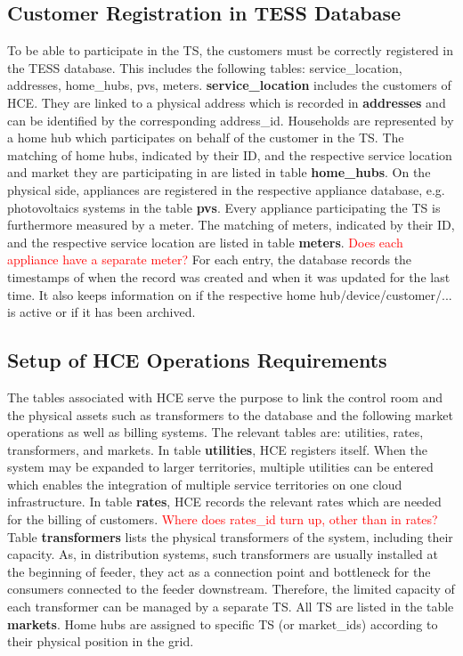 \subsection{Customer Registration in TESS Database}

To be able to participate in the TS, the customers must be correctly registered in the TESS database. This includes the following tables: service\_location, addresses, home\_hubs, pvs, meters. \textbf{service\_location} includes the customers of HCE. They are linked to a physical address which is recorded in \textbf{addresses} and can be identified by the corresponding address\_id. Households are represented by a home hub which participates on behalf of the customer in the TS. The matching of home hubs, indicated by their ID, and the respective service location and market they are participating in are listed in table \textbf{home\_hubs}. On the physical side, appliances are registered in the respective appliance database, e.g. photovoltaics systems in the table \textbf{pvs}. Every appliance participating the TS is furthermore measured by a meter. The matching of meters, indicated by their ID, and the respective service location are listed in table \textbf{meters}.
\textcolor{red}{Does each appliance have a separate meter?}
For each entry, the database records the timestamps of when the record was created and when it was updated for the last time. It also keeps information on if the respective home hub/device/customer/... is active or if it has been archived.

\subsection{Setup of HCE Operations Requirements}

The tables associated with HCE serve the purpose to link the control room and the physical assets such as transformers to the database and the following market operations as well as billing systems. The relevant tables are: utilities, rates, transformers, and markets. In table \textbf{utilities}, HCE registers itself. When the system may be expanded to larger territories, multiple utilities can be entered which enables the integration of multiple service territories on one cloud infrastructure. In table \textbf{rates}, HCE records the relevant rates which are needed for the billing of customers. \textcolor{red}{Where does rates\_id turn up, other than in rates?} 
Table \textbf{transformers} lists the physical transformers of the system, including their capacity. As, in distribution systems, such transformers are usually installed at the beginning of feeder, they act as a connection point and bottleneck for the consumers connected to the feeder downstream. Therefore, the limited capacity of each transformer can be managed by a separate TS. All TS are listed in the table \textbf{markets}. Home hubs are assigned to specific TS (or market\_ids) according to their physical position in the grid.

